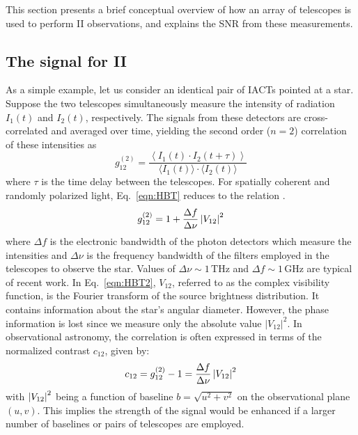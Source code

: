 This section presents a brief conceptual overview of how an array of telescopes is used to perform II observations, and explains the SNR from these measurements.
\subsection{The signal for II}\label{sec:signal}
As a simple example, let us consider an identical pair of IACTs pointed at a star. Suppose the two telescopes simultaneously measure the intensity of radiation $I_1(t)$ and $I_2(t)$, respectively. The signals from these detectors are cross-correlated and averaged over time, yielding the second order ($n=2$) correlation of these intensities as \citep[cf.][]{acciari2020optical, 2013APh....43..331D}
\begin{equation}
	g^{(2)}_{12} = \frac{\left\langle I_1(t) \cdot I_2(t + \tau) \right\rangle}{\langle I_1(t) \rangle \cdot \langle I_2(t) \rangle} 
	\label{eqn:HBT}
\end{equation}
where $\tau$ is the time delay between the telescopes. For spatially coherent and randomly polarized light, Eq.~\eqref{eqn:HBT} reduces to the relation \citep[sometimes called the Siegert relation, see e.g.,][]{acciari2020optical}.
\begin{equation}
	g^{(2)}_{12} = 1 + \frac{\Delta f}{\Delta \nu} \abs{V_{12}}^2
	\label{eqn:HBT2}
\end{equation}
where $\Delta f$ is the electronic bandwidth of the photon detectors which measure the intensities and $\Delta \nu$ is the frequency bandwidth of the filters employed in the telescopes to observe the star.  Values of $\Delta\nu\sim 1\,\mathrm{THz}$ and $\Delta f \sim 1\,\mathrm{GHz}$ are typical of recent work.  In Eq.~\eqref{eqn:HBT2}, $V_{12}$, referred to as the complex visibility function, is the Fourier transform of the source brightness distribution. It contains information about the star's angular diameter. However, the phase information is lost since we measure only the absolute value $\vert V_{12} \vert^2$. In observational astronomy, the correlation is often expressed in terms of the normalized contrast $c_{12}$, given by:
\begin{equation}
    c_{12} = g^{(2)}_{12} - 1 = \frac{\Delta f}{\Delta \nu} \abs{V_{12}}^2
	\label{eq:signal}
\end{equation}
with $\left|V_{12}\right|^2$ being a function of baseline $b = \sqrt{u^2 + v^2}$ on the observational plane $(u, v)$. This implies the strength of the signal would be enhanced if a larger number of baselines or pairs of telescopes are employed. 

